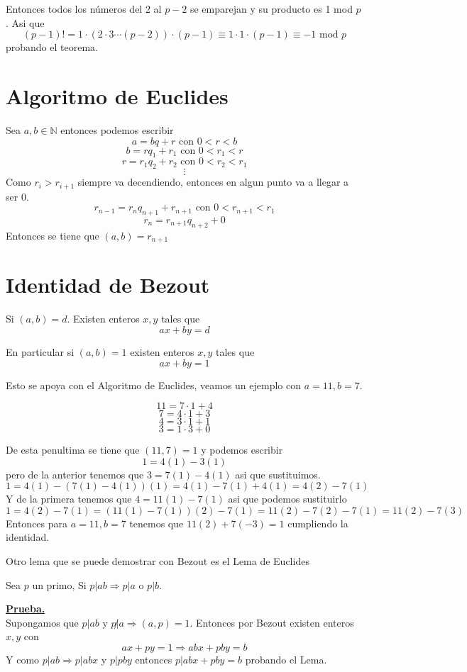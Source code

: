 \documentclass[11pt]{scrartcl}
\begin{document}
Entonces todos los números del 2 al $p-2$ se emparejan y su producto es 1 mod $p$. 
Asi que 
$$(p-1)!=1\cdot(2\cdot3\cdots (p-2))\cdot (p-1)\equiv 1\cdot 1 \cdot (p-1)\equiv -1 \text{ mod } p$$
probando el teorema.



\section{ Algoritmo de Euclides}

Sea $a,b \in \mathbb{N}$ entonces podemos escribir
$$a=bq+r \text{  con } 0< r < b$$
$$b=rq_1+r_1 \text{  con } 0< r_1 < r$$
$$r=r_1q_2+r_2 \text{  con } 0< r_2<r_1$$
$$\vdots$$
Como $r_i>r_{i+1}$ siempre va decendiendo, entonces en algun punto va a llegar a ser 0. \\
$$r_{n-1}=r_nq_{n+1}+r_{n+1} \text{  con } 0< r_{n+1}<r_1$$
$$r_n=r_{n+1}q_{n+2}+0$$ 
Entonces se tiene que $(a,b)=r_{n+1}$

\section{Identidad de Bezout}
\begin{theorem}
     Si $(a,b)=d$. Existen enteros $x,y$ tales que 
    $$ax+by=d$$
\end{theorem}
\begin{remark*}
En particular si $(a,b)=1$ existen enteros $x,y$ tales que 
$$ax+by=1$$
\end{remark*}

Esto se apoya con el Algoritmo de Euclides, veamos un ejemplo con $a=11, b=7$. 

\begin{example}
    $$11=7\cdot 1+4$$
    $$7=4\cdot 1+3$$
    $$4=3\cdot 1+1$$
    $$3=1\cdot 3+0$$

    De esta penultima se tiene que $(11,7)=1$ y podemos escribir
    $$1=4(1)-3(1)$$
    pero de la anterior tenemos que $3=7(1)-4(1)$ asi que sustituimos.
    $$1=4(1)-(7(1)-4(1))(1)=4(1)-7(1)+4(1)=4(2)-7(1)$$
    Y de la primera tenemos que $4=11(1)-7(1)$ asi que podemos sustituirlo
    $$1=4(2)-7(1)=(11(1)-7(1))(2)-7(1)=11(2)-7(2)-7(1)=11(2)-7(3)$$
    Entonces para $a=11, b=7$ tenemos que $11(2)+7(-3)=1$ cumpliendo la identidad.
\end{example}

Otro lema que se puede demostrar con Bezout es el Lema de Euclides
\begin{claim} 
    Sea $p$ un primo, Si $p|ab \Rightarrow p|a$ o $p|b$.
\end{claim}
\underline{\textbf{Prueba.}} \\
Supongamos que $p|ab$ y $p\not | a \Rightarrow (a,p)=1$. Entonces por Bezout existen enteros $x,y$ con 
$$ax+py=1 \Rightarrow abx+pby=b$$
Y como $p|ab \Rightarrow p|abx$ y $p|pby$ entonces $p|abx+pby=b$ probando el Lema. \\
\end{document}
